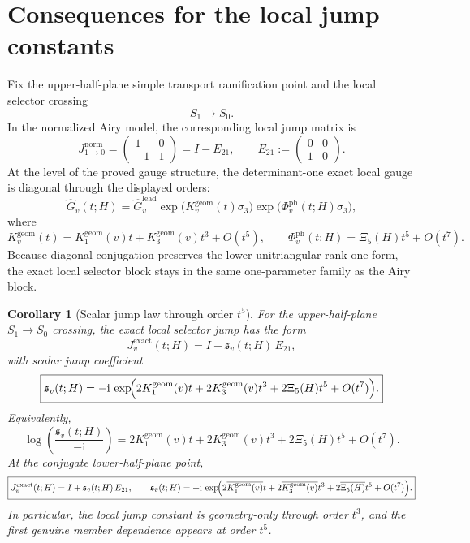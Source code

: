 \documentclass[11pt]{article}
\newtheorem{corollary}{Corollary}
\newcommand{\ii}{\mathrm i}
\newcommand{\leadG}{\widehat G_v^{\mathrm{lead}}}
\newcommand{\phP}{\Phi_v^{\mathrm{ph}}}
\newcommand{\Kone}{K_1^{\mathrm{geom}}(v)}
\newcommand{\Kthree}{K_3^{\mathrm{geom}}(v)}
\newcommand{\Etwone}{E_{21}}
\begin{document}
\section{Consequences for the local jump constants}

Fix the upper-half-plane simple transport ramification point and the local selector crossing
\[
 S_1\longrightarrow S_0.
\]
In the normalized Airy model, the corresponding local jump matrix is
\begin{equation}
\label{eq:Jnorm}
 J^{\mathrm{norm}}_{1\to 0}=
 \begin{pmatrix}
 1 & 0\\
 -1 & 1
 \end{pmatrix}
 = I-\Etwone,
 \qquad
 \Etwone:=\begin{pmatrix}0&0\\1&0\end{pmatrix}.
\end{equation}
At the level of the proved gauge structure, the determinant-one exact local gauge is diagonal through the displayed orders:
\[
 \widehat G_v(t;H)
 =
 \leadG
 \exp\!\bigl(K^{\mathrm{geom}}_v(t)\sigma_3\bigr)
 \exp\!\bigl(\phP(t;H)\sigma_3\bigr),
\]
where
\[
 K^{\mathrm{geom}}_v(t)=\Kone t+\Kthree t^3+O(t^5),
 \qquad
 \phP(t;H)=\Xi_5(H)t^5+O(t^7).
\]
Because diagonal conjugation preserves the lower-unitriangular rank-one form, the exact local selector block stays in the same one-parameter family as the Airy block.

\begin{corollary}[Scalar jump law through order $t^5$]
\label{cor:jump-law}
For the upper-half-plane $S_1\to S_0$ crossing, the exact local selector jump has the form
\begin{equation}
\label{eq:Jexact-upper}
 \boxed{
 J_v^{\mathrm{exact}}(t;H)=I+\mathfrak s_v(t;H)\,\Etwone,
 }
\end{equation}
with scalar jump coefficient
\begin{equation}
\label{eq:sv-exp}
 \boxed{
 \mathfrak s_v(t;H)
 =
 -\ii\,\exp\!\Bigl(
 2\Kone t+2\Kthree t^3+2\Xi_5(H)t^5+O(t^7)
 \Bigr).
 }
\end{equation}
Equivalently,
\begin{equation}
\label{eq:logsv}
 \boxed{
 \log\!\left(\frac{\mathfrak s_v(t;H)}{-\ii}\right)
 =
 2\Kone t+2\Kthree t^3+2\Xi_5(H)t^5+O(t^7).
 }
\end{equation}
At the conjugate lower-half-plane point,
\begin{equation}
\label{eq:Jexact-lower}
 \boxed{
 J_{\bar v}^{\mathrm{exact}}(t;H)=I+\mathfrak s_{\bar v}(t;H)\,\Etwone,
 \qquad
 \mathfrak s_{\bar v}(t;H)=+\ii\,\exp\!\Bigl(2\overline{\Kone}t+2\overline{\Kthree}t^3+2\overline{\Xi_5(H)}t^5+O(t^7)\Bigr).
 }
\end{equation}
In particular, the local jump constant is geometry-only through order $t^3$, and the first genuine member dependence appears at order $t^5$.
\end{corollary}
\end{document}
